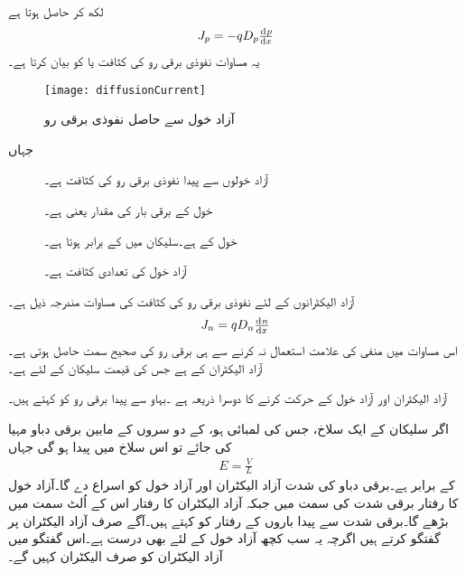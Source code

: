 لکھ کر حاصل ہوتا ہے
\begin{align}
J_p = -q D_p \od{p}{x}
\end{align}
یہ مساوات نفوذی برقی رو کی کثافت یا  کو بیان کرتا ہے۔
\begin{figure}
\centering
\texttt{[image: diffusionCurrent]}
\caption{  آزاد خول سے حاصل نفوذی برقی رو}
\label{شکل_آزاد_خول_سے_حاصل_برقی_رو}
\end{figure}
جہاں
\begin{description}
\item
[ ] آزاد خولوں سے پیدا نفوذی برقی رو کی کثافت  ہے۔
\item
[] خول کے برقی بار کی مقدار یعنی  ہے۔
\item
[] خول کے   ہے۔سلیکان میں کے برابر ہوتا ہے۔
\item
[] آزاد خول کی تعدادی کثافت ہے۔
\end{description}


آزاد الیکٹرانوں کے لئے نفوذی برقی رو کی کثافت کی مساوات مندرجہ ذیل ہے۔
\begin{align}
J_n = q D_n \od{n}{x}
\end{align}
اس مساوات میں منفی کی علامت استعمال نہ کرنے سے ہی برقی رو کی صحیح سمت حاصل ہوتی ہے۔  آزاد الیکٹران کے  ہے جس کی قیمت سلیکان کے لئے  ہے۔

	آزاد الیکٹران اور آزاد خول کے حرکت کرنے کا دوسرا ذریعہ  ہے ۔بہاو سے پیدا برقی رو کو   کہتے ہیں۔

اگر سلیکان کے ایک سلاخ، جس کی لمبائی  ہو، کے دو سروں کے مابین برقی دباو  مہیا کی جائے تو اس سلاخ میں    پیدا ہو گی جہاں
\begin{align*}
E=\frac{V}{L}
\end{align*}
کے برابر ہے۔برقی دباو کی شدت آزاد الیکٹران اور آزاد خول کو اسراع دے گا۔آزاد خول کا رفتار برقی شدت کی سمت میں جبکہ آزاد الیکٹران کا رفتار اس کے اُلٹ سمت میں بڑھے گا۔برقی شدت سے پیدا باروں کے رفتار کو   کہتے ہیں۔آگے صرف آزاد الیکٹران پر گفتگو کرتے ہیں اگرچہ  یہ سب کچھ آزاد خول کے لئے بھی درست ہے۔اس گفتگو میں آزاد الیکٹران کو صرف الیکٹران کہیں گے۔

